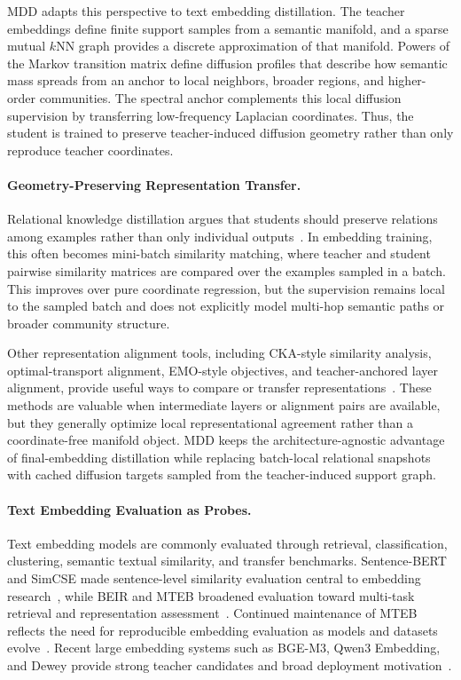 MDD adapts this perspective to text embedding distillation. The teacher embeddings define finite support samples from a semantic manifold, and a sparse mutual $k$NN graph provides a discrete approximation of that manifold. Powers of the Markov transition matrix define diffusion profiles that describe how semantic mass spreads from an anchor to local neighbors, broader regions, and higher-order communities. The spectral anchor complements this local diffusion supervision by transferring low-frequency Laplacian coordinates. Thus, the student is trained to preserve teacher-induced diffusion geometry rather than only reproduce teacher coordinates.

\paragraph{Geometry-Preserving Representation Transfer.}
Relational knowledge distillation argues that students should preserve relations among examples rather than only individual outputs~\citep{park2019rkd}. In embedding training, this often becomes mini-batch similarity matching, where teacher and student pairwise similarity matrices are compared over the examples sampled in a batch. This improves over pure coordinate regression, but the supervision remains local to the sampled batch and does not explicitly model multi-hop semantic paths or broader community structure.

Other representation alignment tools, including CKA-style similarity analysis, optimal-transport alignment, EMO-style objectives, and teacher-anchored layer alignment, provide useful ways to compare or transfer representations~\citep{kornblith2019similarity,alqahtani2021ot,truong2025emo,dao2026talas}. These methods are valuable when intermediate layers or alignment pairs are available, but they generally optimize local representational agreement rather than a coordinate-free manifold object. MDD keeps the architecture-agnostic advantage of final-embedding distillation while replacing batch-local relational snapshots with cached diffusion targets sampled from the teacher-induced support graph.

\paragraph{Text Embedding Evaluation as Probes.}
Text embedding models are commonly evaluated through retrieval, classification, clustering, semantic textual similarity, and transfer benchmarks. Sentence-BERT and SimCSE made sentence-level similarity evaluation central to embedding research~\citep{reimers2019sentencebert,gao2021simcse}, while BEIR and MTEB broadened evaluation toward multi-task retrieval and representation assessment~\citep{thakur2021beir,muennighoff2023mteb}. Continued maintenance of MTEB reflects the need for reproducible embedding evaluation as models and datasets evolve~\citep{chung2025maintainingmteb}. Recent large embedding systems such as BGE-M3, Qwen3 Embedding, and Dewey provide strong teacher candidates and broad deployment motivation~\citep{chen2024bgem3,zhang2025qwen3embedding,zhang2025dewey}.

